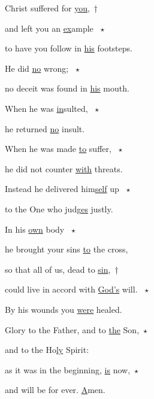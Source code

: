 \noindent Christ suffered for \uline{you},~†~\nopagebreak

and left you an \uline{ex}ample ~$\star$~\nopagebreak

to have you follow in \uline{his} footsteps.

\noindent He did \uline{no} wrong; ~$\star$~\nopagebreak

no deceit was found in \uline{his} mouth.

\noindent When he was \uline{in}sulted, ~$\star$~\nopagebreak

he returned \uline{no} insult.

\noindent When he was made \uline{to} suffer, ~$\star$~\nopagebreak

he did not counter \uline{with} threats.

\noindent Instead he delivered him\uline{self} up ~$\star$~\nopagebreak

to the One who judg\uline{es} justly.

\noindent In his \uline{own} body ~$\star$~\nopagebreak

he brought your sins \uline{to} the cross,

\noindent so that all of us, dead to \uline{sin},~†~\nopagebreak

could live in accord with \uline{God’s} will. ~$\star$~\nopagebreak

By his wounds you \uline{were} healed.

\noindent Glory to the Father, and to \uline{the} Son,~$\star$~\nopagebreak

and to the Ho\uline{ly} Spirit:

\noindent as it was in the beginning, \uline{is} now,~$\star$~\nopagebreak

and will be for ever. \uline{A}men.
